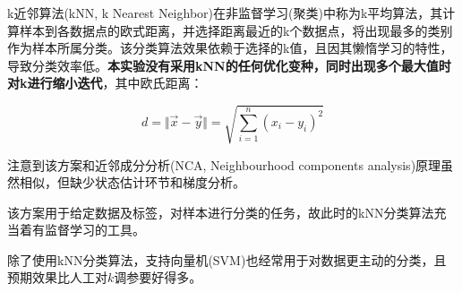 k近邻算法(kNN, k Nearest Neighbor)在非监督学习(聚类)中称为k平均算法，其计算样本到各数据点的欧式距离，并选择距离最近的k个数据点，将出现最多的类别作为样本所属分类。该分类算法效果依赖于选择的k值，且因其懒惰学习的特性，导致分类效率低。\textbf{本实验没有采用kNN的任何优化变种，同时出现多个最大值时对k进行缩小迭代}，其中欧氏距离：\cite{Guo_2003}

\begin{equation}
    d = \Vert\vec x - \vec y\Vert = \sqrt{\sum^{n}_{i=1} {(x_i - y_i)}^2}
\end{equation}


注意到该方案和近邻成分分析(NCA, Neighbourhood components analysis)原理虽然相似，但缺少状态估计环节和梯度分析。

该方案用于给定数据及标签，对样本进行分类的任务，故此时的kNN分类算法充当着有监督学习的工具。

除了使用kNN分类算法，支持向量机(SVM)也经常用于对数据更主动的分类，且预期效果比人工对$k$调参要好得多。\cite{Cortes_1995, techping_2018, Hu_2019}